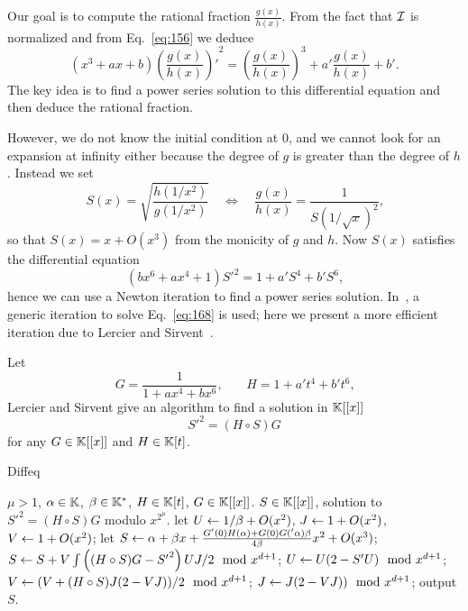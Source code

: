 Our goal is to compute the rational fraction $\frac{g(x)}{h(x)}$. From
the fact that $\mathcal{I}$ is normalized and from Eq.~\eqref{eq:156} we deduce
\begin{equation}
  \label{eq:166}
  (x^3 + ax + b){\left(\frac{g(x)}{h(x)}\right)'}^2 =
  \left(\frac{g(x)}{h(x)}\right)^3 + a'\frac{g(x)}{h(x)} + b'
  \text{.}
\end{equation}
The key idea is to find a power series solution to this differential
equation and then deduce the rational fraction.

However, we do not know the initial condition at $0$, and we cannot
look for an expansion at infinity either because the degree of $g$ is
greater than the degree of $h$.  Instead we set
\begin{equation}
  \label{eq:167}
  S(x) = \sqrt{\frac{h(1/x^2)}{g(1/x^2)}}
  \quad\Leftrightarrow\quad
  \frac{g(x)}{h(x)} = \frac{1}{S(1/\sqrt{x})^2}
  \text{,}
\end{equation}
so that $S(x) = x + O(x^3)$ from the monicity of $g$ and $h$. Now
$S(x)$ satisfies the differential equation
\begin{equation}
  \label{eq:168}
  (bx^6 + ax^4 + 1){S'}^2 = 1 + a'S^4 + b'S^6
  \text{,}
\end{equation}
hence we can use a Newton iteration to find a power series
solution. In~\cite[2.4]{bostan+morain+salvy+schost08}, a generic
iteration to solve Eq.~\eqref{eq:168} is used; here we present a more
efficient iteration due to Lercier and
Sirvent~\cite{lercier+sirvent08}.

Let 
\begin{equation}
  \label{eq:169}
  G = \frac{1}{1 + ax^4 + bx^6}
  \text{,}\qquad
  H = 1 + a't^4 + b't^6
  \text{,}
\end{equation}
Lercier and Sirvent give an algorithm to find a solution in $\mathbb{K}[[x]]$
\begin{equation}
  \label{eq:170}
  {S'}^2 = (H\circ S)G
\end{equation}
for any $G\in\mathbb{K}[[x]]$ and $H\in\mathbb{K}[t]$.


\begin{algorithm}
  \label{alg:le-si-diff}
  \caption{Diffeq}
  \begin{algorithmic}[1]
    \REQUIRE $\mu>1$, $\alpha\in\mathbb{K}$, $\beta\in\mathbb{K}^\ast$, $H\in\mathbb{K}[t]$, $G\in\mathbb{K}[[x]]$.
    \ENSURE $S\in\mathbb{K}[[x]]$, solution to ${S'}^2=(H\circ S)G$ modulo $x^{2^\mu}$.
    \STATE let $U \leftarrow 1/\beta +O(x^2)$, $J \leftarrow 1 + O(x^2)$, $V \leftarrow 1 + O(x^2)$;
    \STATE let $S \leftarrow \alpha + \beta x +  \frac{G'(0)H(\alpha) + G(0)G('\alpha)\beta}{4\beta}x^2+O(x^3)$;
    \STATE \label{alg:le-si-diff:int}$S \leftarrow S + V\int\left((H\circ S)G - {S'}^2\right)UJ/2 \mod x^{d+1}$;
    \STATE $U \leftarrow U(2 - S' U) \mod x^{d+1}$;
    \STATE $V \leftarrow (V +  (H\circ S) J (2 - VJ))/2 \mod x^{d+1}$;
    \STATE $J \leftarrow J(2-VJ)) \mod x^{d+1}$;
    \ENDFOR
    \STATE output $S$.
  \end{algorithmic}
\end{algorithm}

